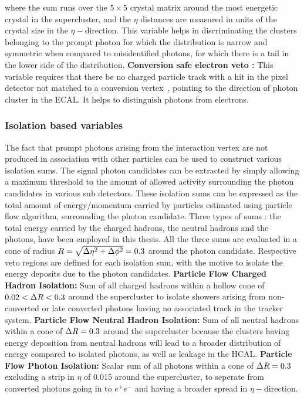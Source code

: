 where the sum runs over the $5\times5$ crystal matrix around the most energetic crystal in the supercluster, and the $\eta$ distances are measured in 
units of the crystal size in the $\eta-$direction. This variable helps in discriminating the clusters belonging  to the prompt photon for which the 
distribution is narrow and symmetric when compared to misidentified photons, for which there is a tail in the lower side of the distribution.
\newline
{\bf Conversion safe electron veto : } This variable requires that there be no charged particle track with a hit in the pixel detector not matched to a 
conversion vertex~\cite{Khachatryan:2015iwa}, pointing to the direction of photon cluster in the ECAL. It helps to distinguish photons from electrons.

\subsubsection{Isolation based variables}\label{Se:photonIso}
The fact that prompt photons arising from the interaction vertex are not produced in association with other particles can be used to construct 
various isolation sums. The signal
photon candidates can be extracted by simply allowing a maximum threshold to the amount of allowed activity surrounding the photon candidates
in various sub detectors. These isolation sums can be expressed as the total amount of energy/momentum carried by particles estimated using 
particle flow algorithm, surrounding the photon candidate. Three types of sums : the total energy carried by the charged hadrons, the neutral 
hadrons and the photons, have been employed in this thesis. All the three sums are evaluated in a cone of radius $R=\sqrt{\Delta\eta^{2}+\Delta\phi^{2}} = 0.3$ around the photon candidate. Respective veto regions are defined for each isolation sum, with the motive to isolate the energy deposits due to the
photon candidates. 
\newline
{\bf Particle Flow Charged Hadron Isolation: } Sum \pt of all charged hadrons within a hollow cone of $0.02<\Delta{R}<0.3$ around the supercluster to 
isolate showers arising from non-converted or late converted photons having no associated track in the tracker system.
\newline
{\bf Particle Flow Neutral Hadron Isolation: } Sum \pt of all neutral hadrons within a cone of $\Delta{R}=0.3$ around the supercluster because the 
clusters having energy deposition from neutral hadrons will lead to a broader distribution of energy compared to isolated photons, as well as 
leakage in the HCAL.
\newline
{\bf Particle Flow Photon Isolation: } Scalar sum \pt of all photons within a cone of $\Delta{R}=0.3$ excluding a strip in $\eta$ of 0.015 around 
the supercluster, to seperate from converted photons going in to $e^{+}e^{-}$ and having a broader spread in $\eta-$direction.

